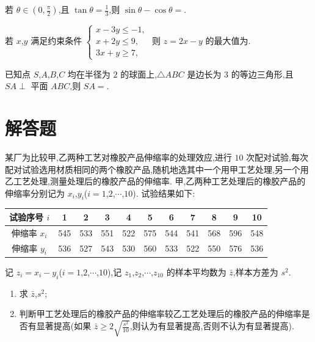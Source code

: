 \begin{problem}
若 \(\theta\in\left(0,\frac\pi2\right)\),且 \(\tan\theta=\frac13\),则 \(\sin\theta-\cos\theta=\)\fillinblank{}.

\end{problem}

\begin{problem}
若 \(x\),\(y\) 满足约束条件 \(\begin{cases}
x-3y\le-1,\\
x+2y\le9,\\
3x+y\ge7,
\end{cases}\) 则 \(z=2x-y\) 的最大值为\fillinblank{}.

\end{problem}

\begin{problem}
已知点 \(S\),\(A\),\(B\),\(C\) 均在半径为 \(2\) 的球面上,\(\triangle ABC\) 是边长为 \(3\) 的等边三角形,且 \(SA\perp\) 平面 \(ABC\),则 \(SA=\)\fillinblank{}.

\end{problem}

\section{解答题}

\begin{problem}
某厂为比较甲,乙两种工艺对橡胶产品伸缩率的处理效应,进行 \(10\) 次配对试验,每次配对试验选用材质相同的两个橡胶产品,随机地选其中一个用甲工艺处理,另一个用乙工艺处理,测量处理后的橡胶产品的伸缩率. 甲,乙两种工艺处理后的橡胶产品的伸缩率分别记为 \(x_i\),\(y_i\)(\(i=1\),\(2\),\(\cdots\),\(10\)). 试验结果如下:

\begin{center}
\begin{tabular}{c|cccccccccc}
试验序号 \(i\)&1&2&3&4&5&6&7&8&9&10\\\hline
伸缩率 \(x_i\)&545&533&551&522&575&544&541&568&596&548\\
伸缩率 \(y_i\)&536&527&543&530&560&533&522&550&576&536
\end{tabular}
\end{center}

记 \(z_i=x_i-y_i\)(\(i=1\),\(2\),\(\cdots\),\(10\)),记 \(z_1\),\(z_2\),\(\cdots\),\(z_{10}\) 的样本平均数为 \(\bar z\),样本方差为 \(s^2\).
\begin{enumerate}
\item 求 \(\bar z\),\(s^2\);
\item 判断甲工艺处理后的橡胶产品的伸缩率较乙工艺处理后的橡胶产品的伸缩率是否有显著提高(如果 \(\bar z\ge2\sqrt{\frac{s^2}{10}}\),则认为有显著提高,否则不认为有显著提高).
\end{enumerate}

\end{problem}

